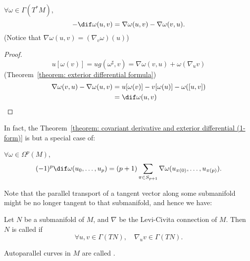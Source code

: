 \documentclass[openany, oneside, a5paper]{book}
\begin{document}
\begin{theorem}\label{theorem: covariant derivative and exterior differential (1-form)}
    $\forall \omega \in \Gamma(T^*M)$,
    \begin{equation}
        - \dif \omega(u, v) = \nabla \omega(u, v) - \nabla\omega(v, u).
    \end{equation}
    (Notice that $\nabla \omega(u, v) = (\nabla_v \omega) (u)$)
\end{theorem}
\begin{proof}
    \begin{equation}
        u[\omega(v)] = u g(\omega^\sharp, v) = \nabla \omega(v, u) + \omega(\nabla_u v)
    \end{equation}
    \hence (Theorem~\ref{theorem: exterior differential formula})
    \begin{align}
        \nabla \omega(v, u) - \nabla \omega (u, v) 
        &= u[\omega(v)] - v[\omega(u)] - \omega([u, v])
        \\
        &= \dif \omega(u, v)
    \end{align}
\end{proof}

In fact, the Theorem~\ref{theorem: covariant derivative and exterior differential (1-form)} is but a special case of:
\begin{theorem}\label{theorem: covariant derivative and exterior differential}
    $\forall \omega \in \Omega^p(M)$,
    \begin{equation}
        (-1)^p \dif \omega(u_0, \ldots, u_p) = 
        (p + 1) \sum_{\pi \in S_{p + 1}} \nabla \omega (u_{\pi(0)}, \ldots, u_{\pi(p)}).
    \end{equation}
    
\end{theorem}

Note that the parallel transport of a tangent vector along some submanifold might be no longer tangent to that submanifold, and hence we have:

\begin{definition}
    Let $N$ be a submanifold of $M$, and $\nabla$ be the Levi-Civita connection of $M$.
    Then $N$ is called  if
    \begin{equation}
        \forall u, v \in \Gamma(TN), \quad
        \nabla_u v \in \Gamma(TN).
    \end{equation}
\end{definition}


Autoparallel curves in $M$ are called .
\end{document}
